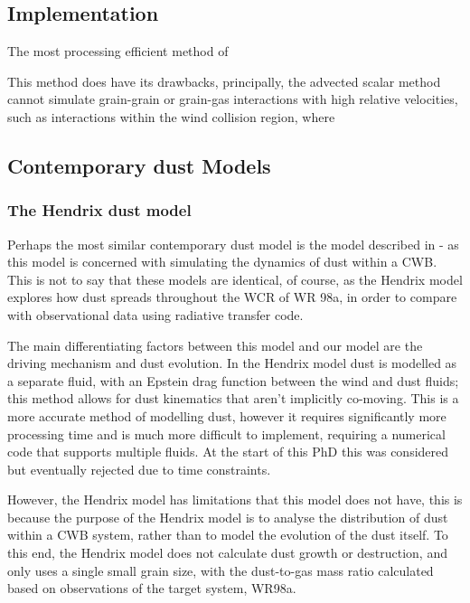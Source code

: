 \subsection{Implementation}

\parencite{dwekCoolingSputteringInfrared1996}

The most processing efficient method of 


This method does have its drawbacks, principally, the advected scalar method cannot simulate grain-grain or grain-gas interactions with high relative velocities, such as interactions within the wind collision region, where 

\subsection{Contemporary dust Models}



\subsubsection{The Hendrix dust model}

Perhaps the most similar contemporary dust model is the model described in \cite{hendrix_pinwheels_2016} - as this model is concerned with simulating the dynamics of dust within a CWB.
This is not to say that these models are identical, of course, as the Hendrix model explores how dust spreads throughout the WCR of WR 98a, in order to compare with observational data using radiative transfer code.


The main differentiating factors between this model and our model are the driving mechanism and dust evolution.
In the Hendrix model dust is modelled as a separate fluid, with an Epstein drag function between the wind and dust fluids; this method allows for dust kinematics that aren't implicitly co-moving.
This is a more accurate method of modelling dust, however it requires significantly more processing time and is much more difficult to implement, requiring a numerical code that supports multiple fluids.
At the start of this PhD this was considered but eventually rejected due to time constraints.

However, the Hendrix model has limitations that this model does not have, this is because the purpose of the Hendrix model is to analyse the distribution of dust within a CWB system, rather than to model the evolution of the dust itself.
To this end, the Hendrix model does not calculate dust growth or destruction, and only uses a single small grain size, with the dust-to-gas mass ratio calculated based on observations of the target system, WR98a.



